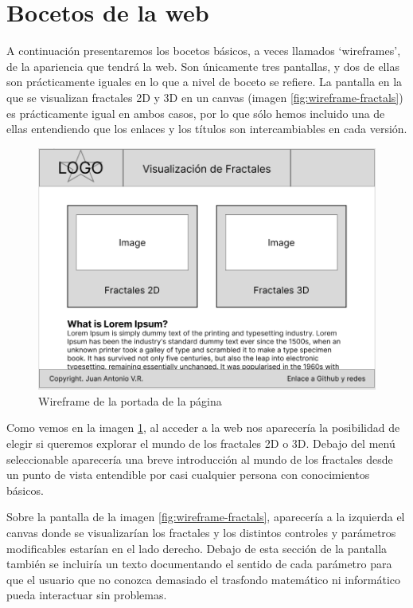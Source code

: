 \section*{Bocetos de la web}

A continuación presentaremos los bocetos básicos, a veces llamados `wireframes', de la apariencia que tendrá la web. Son únicamente tres pantallas, y dos de ellas son prácticamente iguales en lo que a nivel de boceto se refiere. La pantalla en la que se visualizan fractales 2D y 3D en un canvas (imagen \ref{fig:wireframe-fractals}) es prácticamente igual en ambos casos, por lo que sólo hemos incluido una de ellas entendiendo que los enlaces y los títulos son intercambiables en cada versión. 

\begin{figure} [ht]
    \centering
    \includegraphics[width=12cm]{img/wireframe-home.png}
    \caption{Wireframe de la portada de la página}
    \label{fig:wireframe-home}
    \end{figure}



Como vemos en la imagen \ref{fig:wireframe-home}, al acceder a la web nos aparecería la posibilidad de elegir si queremos explorar el mundo de los fractales 2D o 3D. Debajo del menú seleccionable aparecería una breve introducción al mundo de los fractales desde un punto de vista entendible por casi cualquier persona con conocimientos básicos.


\newpage

Sobre la pantalla de la imagen \ref{fig:wireframe-fractals}, aparecería a la izquierda el canvas donde se visualizarían los fractales y los distintos controles y parámetros modificables estarían en el lado derecho. Debajo de esta sección de la pantalla también se incluiría un texto documentando el sentido de cada parámetro para que el usuario que no conozca demasiado el trasfondo matemático ni informático pueda interactuar sin problemas.

